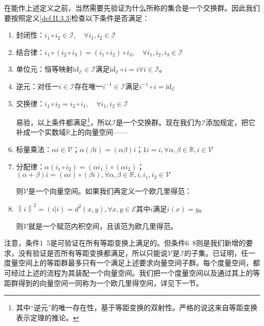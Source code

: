\documentclass[main.tex]{subfiles}
\begin{document}
在能作上述定义之前，当然需要先验证为什么所称的集合是一个交换群。因此我们要按照定义\ref{def:II.3.3}检查以下条件是否满足：
\begin{enumerate}
    \item 封闭性：$i_1\circ i_2\in\mathcal{I},\quad\forall i_1,i_2\in\mathcal{I}$
    \item 结合律：$i_1\circ \left(i_2\circ i_3\right)=\left(i_1\circ i_2\right)\circ i_3,\quad\forall i_1,i_2,i_3\in\mathcal{I}$
    \item 单位元：恒等映射$\mathrm{id}_\mathcal{E}\in\mathcal{I}$满足$\mathrm{id}_\mathcal{E}\circ i=i\forall i\in\mathcal{I}$。
    \item 逆元：对任一$i\in\mathcal{I}$存在唯一$i^{-1}\in\mathcal{I}$满足$i^{-1}\circ i=\mathrm{id}_\mathcal{E}$
    \item 交换律：$i_1\circ i_2=i_2\circ i_1,\quad\forall i_1,i_2\in\mathcal{I}$

          易验，以上条件都满足\footnote{其中“逆元”的唯一存在性，基于等距变换的双射性。严格的说这来自等距变换表示定理的推论。}，所以$\mathcal{I}$是一个交换群。现在我们为$\mathcal{I}$添加规定，把它补成一个实数域$\mathbb{R}$上的向量空间——

    \item 标量乘法：$\alpha i\in\mathcal{V}$；$\alpha\left(\beta i\right)=\left(\alpha\beta\right)i$；$1i=i,\forall\alpha,\beta\in\mathbb{R},i\in\mathcal{V}$
    \item 分配律：$\alpha\left(i_1\circ i_2\right)=\left(\alpha i_1\right)\circ\left(\alpha i_2\right)$；$\left(\alpha+\beta\right)i=\left(\alpha i\right)\circ\left(\beta i\right),\forall\alpha,\beta\in\mathbb{R},i,i_1,i_2\in\mathcal{V}$

          则$\mathcal{V}$是一个向量空间。如果我们再定义一个欧几里得范：

    \item $\left\|i\right\|^2=\left(i|i\right)= d^2\left(x,y\right),\forall x,y\in\mathcal{E}$其中$i$满足$i\left(x\right)=y$。

          则$\mathcal{V}$就是一个赋范内积空间，且该范为欧几里得范。
\end{enumerate}

注意，条件1~5是可验证在所有等距变换上满足的。但条件6~8则是我们新增的要求，没有验证是否所有等距变换都满足，所以只能说$\mathcal{V}$是$\mathcal{I}$的子集。已证明，任一度量空间上的等距群最多只有一个满足上述要求向量空间子群\cite{Noll1974}。每个度量空间，都可经过上述的流程为其装配一个向量空间。我们把一个度量空间以及通过其上的等距群得到的向量空间一同称为一个欧几里得空间，详见下一节。
\end{document}
